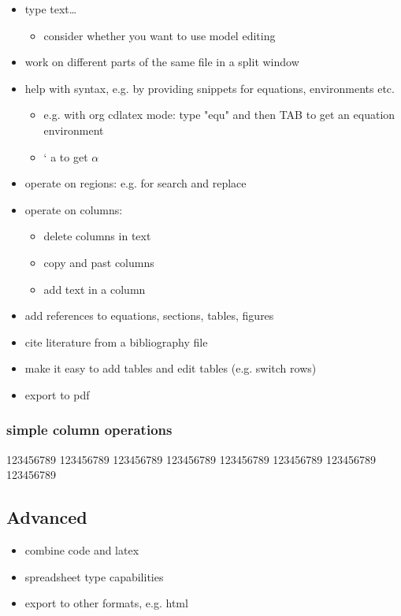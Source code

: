 \documentclass[11pt]{article}
\begin{document}
\begin{itemize}
\item type text\ldots{}
\begin{itemize}
\item consider whether you want to use model editing
\end{itemize}
\item work on different parts of the same file in a split window
\item help with syntax, e.g. by providing snippets for equations, environments etc.
\begin{itemize}
\item e.g. with org cdlatex mode: type "equ" and then TAB to get an equation environment
\item ` a to get \(\alpha\)
\end{itemize}
\item operate on regions: e.g. for search and replace
\item operate on columns:
\begin{itemize}
\item delete columns in text
\item copy and past columns
\item add text in a column
\end{itemize}
\item add references to equations, sections, tables, figures
\item cite literature from a bibliography file
\item make it easy to add tables and edit tables (e.g. switch rows)
\item export to pdf
\end{itemize}


\subsubsection{simple column operations}

123456789
123456789
123456789
123456789
123456789
123456789
123456789
123456789


\subsection{Advanced}

\begin{itemize}
\item combine code and latex
\item spreadsheet type capabilities
\item export to other formats, e.g. html
\end{itemize}
\end{document}
